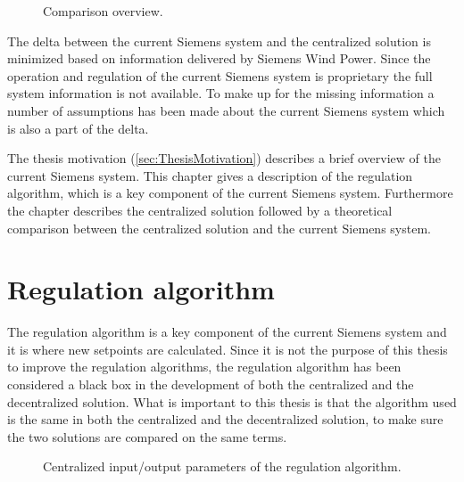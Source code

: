 \begin{figure}[!h]
	\centering
	
	\caption[Comparison overview]{
		\label{fig:projectDiffOverview} 
		\footnotesize{%
			Comparison overview.
		}
	}
\end{figure}

The delta between the current Siemens system and the centralized solution is minimized based on information delivered by Siemens Wind Power. Since the operation and regulation of the current Siemens system is proprietary the full system information is not available. To make up for the missing information a number of assumptions has been made about the current Siemens system which is also a part of the delta.

The thesis motivation (\cref{sec:ThesisMotivation}) describes a brief overview of the current Siemens system. This chapter gives a description of the regulation algorithm, which is a key component of the current Siemens system. Furthermore the chapter describes the centralized solution followed by a theoretical comparison between the centralized solution and the current Siemens system. 

\section{Regulation algorithm}\label{sec:cenRegAlgorithm}
The regulation algorithm is a key component of the current Siemens system and it is where new setpoints are calculated. Since it is not the purpose of this thesis to improve the regulation algorithms, the regulation algorithm has been considered a black box in the development of both the centralized and the decentralized solution. What is important to this thesis is that the algorithm used is the same in both the centralized and the decentralized solution, to make sure the two solutions are compared on the same terms. 


\begin{figure}
	\centering
	

	\caption[Centralized input/output parameters of the regulation algorithm]{
		\label{fig:ioCenRegAlg} 
		\footnotesize{%
			Centralized input/output parameters of the regulation algorithm.
		}
	}
\end{figure}


